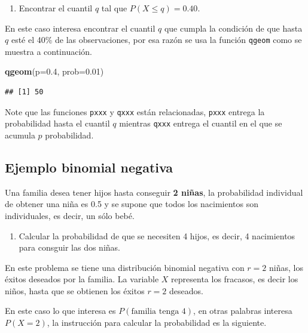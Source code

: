 \documentclass[10pt,]{krantz}
\makeatletter
\newenvironment{Shaded}{\begin{snugshade}}{\end{snugshade}}
\newcommand{\KeywordTok}[1]{\textcolor[rgb]{0.13,0.29,0.53}{\textbf{{#1}}}}
\newcommand{\DataTypeTok}[1]{\textcolor[rgb]{0.13,0.29,0.53}{{#1}}}
\newcommand{\FloatTok}[1]{\textcolor[rgb]{0.00,0.00,0.81}{{#1}}}
\newcommand{\NormalTok}[1]{{#1}}
\providecommand{\tightlist}{%
  \setlength{\itemsep}{0pt}\setlength{\parskip}{0pt}}
\newenvironment{kframe}{%
\medskip{}
\setlength{\fboxsep}{.8em}
 \def\at@end@of@kframe{}%
 \ifinner\ifhmode%
  \def\at@end@of@kframe{\end{minipage}}%
  \begin{minipage}{\columnwidth}%
 \fi\fi%
 \def\FrameCommand##1{\hskip\@totalleftmargin \hskip-\fboxsep
 \colorbox{shadecolor}{##1}\hskip-\fboxsep
     \hskip-\linewidth \hskip-\@totalleftmargin \hskip\columnwidth}%
 \MakeFramed {\advance\hsize-\width
   \@totalleftmargin\z@ \linewidth\hsize
   \@setminipage}}%
 {\par\unskip\endMakeFramed%
 \at@end@of@kframe}
\renewenvironment{Shaded}{\begin{kframe}}{\end{kframe}}
\let\BeginKnitrBlock\begin \let\EndKnitrBlock\end
\makeatother
\begin{document}
\begin{enumerate}
\def\labelenumi{\arabic{enumi})}
\setcounter{enumi}{2}
\tightlist
\item
  Encontrar el cuantil \(q\) tal que \(P(X \leq q) = 0.40\).
\end{enumerate}

En este caso interesa encontrar el cuantil \(q\) que cumpla la condición
de que hasta \(q\) esté el 40\% de las observaciones, por esa razón se
usa la función \texttt{qgeom} como se muestra a continuación.

\begin{Shaded}
\begin{Highlighting}[]
\KeywordTok{qgeom}\NormalTok{(}\DataTypeTok{p=}\FloatTok{0.4}\NormalTok{, }\DataTypeTok{prob=}\FloatTok{0.01}\NormalTok{)}
\end{Highlighting}
\end{Shaded}

\begin{verbatim}
## [1] 50
\end{verbatim}

\BeginKnitrBlock{rmdnote}
Note que las funciones \texttt{pxxx} y \texttt{qxxx} están relacionadas,
\texttt{pxxx} entrega la probabilidad hasta el cuantil \(q\) mientras
\texttt{qxxx} entrega el cuantil en el que se acumula \(p\)
probabilidad.
\EndKnitrBlock{rmdnote}

\subsection*{Ejemplo binomial negativa}\label{ejemplo-binomial-negativa}


Una familia desea tener hijos hasta conseguir \textbf{2 niñas}, la
probabilidad individual de obtener una niña es 0.5 y se supone que todos
los nacimientos son individuales, es decir, un sólo bebé.

\begin{enumerate}
\def\labelenumi{\arabic{enumi})}
\tightlist
\item
  Calcular la probabilidad de que se necesiten 4 hijos, es decir, 4
  nacimientos para consguir las dos niñas.
\end{enumerate}

En este problema se tiene una distribución binomial negativa con \(r=2\)
niñas, los éxitos deseados por la familia. La variable \(X\) representa
los fracasos, es decir los niños, hasta que se obtienen los éxitos
\(r=2\) deseados.

En este caso lo que interesa es \(P(\text{familia tenga 4})\), en otras
palabras interesa \(P(X=2)\), la instrucción para calcular la
probabilidad es la siguiente.
\end{document}
